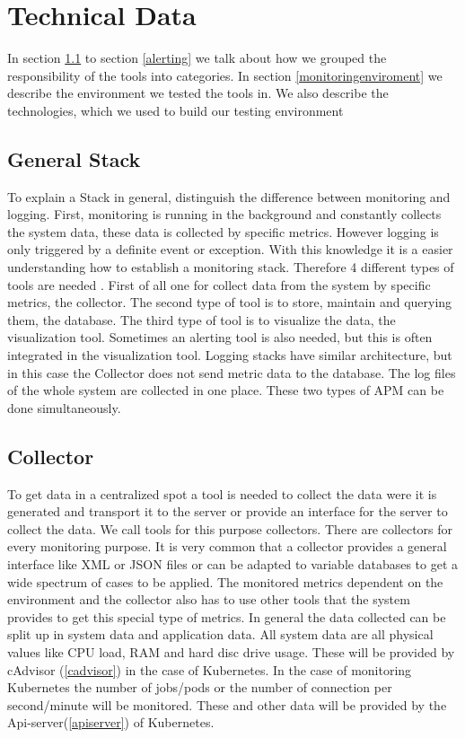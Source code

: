  
\chapter{Technical Data}
\label{chap:ch2}
In section \ref{generalstack} to section \ref{alerting} we talk about how we grouped the responsibility of the tools into categories. In section \ref{monitoringenviroment} we describe the environment we tested the tools in. We also describe the technologies, which we used to build our testing environment

\section{General Stack}
\label{generalstack}
To explain a Stack in general, distinguish the difference between monitoring and logging. First, monitoring is running in the background and constantly collects the system data, these data is collected by specific metrics. However logging is only triggered by a definite event or exception.
With this knowledge it is a easier understanding how to establish a monitoring stack. Therefore 4 different types of tools are needed \cite{cau37427}.
First of all one for collect data from the system by specific metrics, the collector. The second type of tool is to store, maintain and querying them, the database. The third type of tool is to visualize the data, the visualization tool. Sometimes an alerting tool is also needed, but this is often integrated in the visualization tool.
Logging stacks have similar architecture, but in this case the Collector does not send metric data to the database. The log files of the whole system are collected in one place. These two types of APM can be done simultaneously.

\section{Collector}
To get data in a centralized spot a tool is needed to collect the data were it is generated and transport it to the server or provide an interface for the server to collect the data.
We call tools for this purpose collectors. There are collectors for every monitoring purpose. It is very common that a collector provides a general interface like XML or JSON files or can be adapted to variable databases to get a wide spectrum of cases to be applied.
 The monitored metrics dependent on the environment and the collector also has to use other tools that the system provides  to get this special type of metrics. In general the data collected can be split up in system data and application data. All system data are all physical values like CPU load, RAM and hard disc drive usage. These will be provided by cAdvisor (\ref{cadvisor}) in the case of Kubernetes. In the case of monitoring Kubernetes the number of jobs/pods or the number of connection per second/minute will be monitored. These and other data will be provided by the Api-server(\ref{apiserver}) of Kubernetes.
